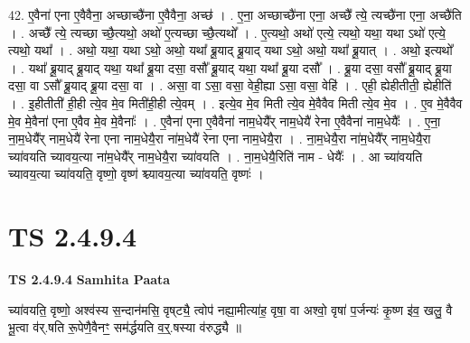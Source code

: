 \documentclass[17pt]{extarticle}
\begin{document}
42. ए॒वैना॑ एना ए॒वैवैना॒ अच्छाच्छै॑ना ए॒वैवैना॒ अच्छ॑ । . ए॒ना॒ अच्छाच्छै॑ना एना॒ अच्छै᳚ त्ये॒ त्यच्छै॑ना एना॒ अच्छै॑ति । . अच्छै᳚ त्ये॒ त्यच्छा च्छै॒त्यथो॒ अथो॑ ए॒त्यच्छा च्छै॒त्यथो᳚ । . ए॒त्यथो॒ अथो॑ एत्ये॒ त्यथो॒ यथा॒ यथा ऽथो॑ एत्ये॒ त्यथो॒ यथा᳚ । . अथो॒ यथा॒ यथा ऽथो॒ अथो॒ यथा᳚ ब्रू॒याद् ब्रू॒याद् यथा ऽथो॒ अथो॒ यथा᳚ ब्रू॒यात् । . अथो॒ इत्यथो᳚ । . यथा᳚ ब्रू॒याद् ब्रू॒याद् यथा॒ यथा᳚ ब्रू॒या दसा॒ वसौ᳚ ब्रू॒याद् यथा॒ यथा᳚ ब्रू॒या दसौ᳚ । . ब्रू॒या दसा॒ वसौ᳚ ब्रू॒याद् ब्रू॒या दसा॒ वा ऽसौ᳚ ब्रू॒याद् ब्रू॒या दसा॒ वा । . असा॒ वा ऽसा॒ वसा॒ वेही॒ह्या ऽसा॒ वसा॒ वेहि॑ । . एही॒ ह्येहीतीती॒ ह्येहीति॑ । . इ॒हीतीती॑ ही॒ही त्ये॒व मे॒व मिती॑ही॒ही त्ये॒वम् । . इत्ये॒व मे॒व मिती त्ये॒व मे॒वैवैव मिती त्ये॒व मे॒व । . ए॒व मे॒वैवैव मे॒व मे॒वैना॑ एना ए॒वैव मे॒व मे॒वैनाः᳚ । . ए॒वैना॑ एना ए॒वैवैना॑ नाम॒धेयै᳚र् नाम॒धेयै॑ रेना ए॒वैवैना॑ नाम॒धेयैः᳚ । . ए॒ना॒ ना॒म॒धेयै᳚र् नाम॒धेयै॑ रेना एना नाम॒धेयै॒रा ना॑म॒धेयै॑ रेना एना नाम॒धेयै॒रा । . ना॒म॒धेयै॒रा ना॑म॒धेयै᳚र् नाम॒धेयै॒रा च्या॑वयति च्यावय॒त्या ना॑म॒धेयै᳚र् नाम॒धेयै॒रा च्या॑वयति । . ना॒म॒धेयै॒रिति॑ नाम - धेयैः᳚ । . आ च्या॑वयति च्यावय॒त्या च्या॑वयति॒ वृष्णो॒ वृष्ण॑ श्च्यावय॒त्या च्या॑वयति॒ वृष्णः॑ । \newline
\pagebreak
{}
\section*{ TS 2.4.9.4 }

\textbf{TS 2.4.9.4 } \newline
\textbf{Samhita Paata} \newline

च्या॑वयति॒ वृष्णो॒ अश्व॑स्य स॒न्दान॑मसि॒ वृष्‌ट्यै॒ त्वोप॑ नह्या॒मीत्या॑ह॒ वृषा॒ वा अश्वो॒ वृषा॑ प॒र्जन्यः॑ कृ॒ष्ण इ॑व॒ खलु॒ वै भू॒त्वा व॑र्.षति रू॒पेणै॒वैनꣳ॒॒ सम॑र्द्धयति व॒र्॒.षस्या व॑रुद्ध्यै ॥ \newline
\end{document}
